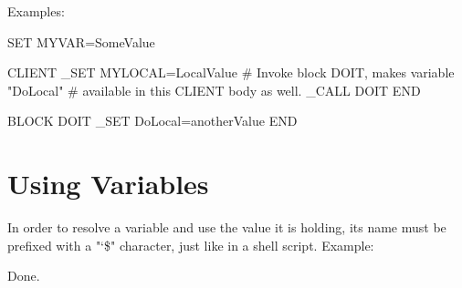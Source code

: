 Examples:

\begin{usplisting}
    SET MYVAR=SomeValue
    
    CLIENT
    _SET MYLOCAL=LocalValue
    # Invoke block DOIT, makes variable "DoLocal"
    # available in this CLIENT body as well.
    _CALL DOIT
    END
    
    BLOCK DOIT
    _SET DoLocal=anotherValue
    END
\end{usplisting}

\newpage
\section{Using Variables}

In order to resolve a variable and use the value it is holding, 
its name must be prefixed with a "\char`\$" character, just like 
in a shell script. Example:


Done.
